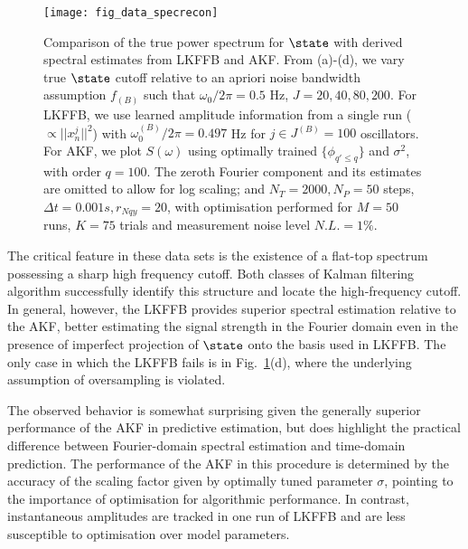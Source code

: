 \begin{figure}[tp]
    \texttt{[image: fig\_data\_specrecon]}
    \caption{\label{fig:main:fig_data_specrecon} Comparison of the true power spectrum for $\state$ with derived spectral estimates from LKFFB and AKF. From (a)-(d), we vary true $\state$ cutoff relative to an apriori noise bandwidth assumption $f_{(B)}$ such that $\omega_0 / 2\pi = 0.5$ Hz, $J = 20, 40, 80, 200$. For LKFFB, we use learned amplitude information from a single run ($\propto ||x^j_n||^2 $) with $\omega_0^{(B)} / 2\pi = 0.497$ Hz for $j \in J^{(B)} = 100$ oscillators. For AKF, we plot $S(\omega)$ using optimally trained $\{\phi_{q' \leq q}\}$ and $\sigma^2$, with order $q = 100$. The zeroth Fourier component and its estimates are omitted to allow for log scaling; and $N_T = 2000, N_P = 50$ steps, $\Delta t = 0.001s, r_{Nqy}=20$, with optimisation performed for $M=50$ runs, $K=75$ trials and measurement noise level $N.L. = 1\%$.} 
\end{figure} 

The critical feature in these data sets is the existence of a flat-top spectrum possessing a sharp high frequency cutoff.  Both classes of Kalman filtering algorithm successfully identify this structure and locate the high-frequency cutoff.  In general, however, the LKFFB provides superior spectral estimation relative to the AKF, better estimating the signal strength in the Fourier domain even in the presence of imperfect projection of $\state$ onto the basis used in LKFFB.  The only case in which the LKFFB fails is in Fig.~\ref{fig:main:fig_data_specrecon}(d), where the underlying assumption of oversampling is violated.  

The observed behavior is somewhat surprising given the generally superior performance of the AKF in predictive estimation, but does highlight the practical difference between Fourier-domain spectral estimation and time-domain prediction.  The performance of the AKF in this procedure is determined by the accuracy of the scaling factor given by optimally tuned parameter $\sigma$, pointing to the importance of optimisation for algorithmic performance. In contrast, instantaneous amplitudes are tracked in one run of LKFFB and are less susceptible to optimisation over model parameters.


\newpage
